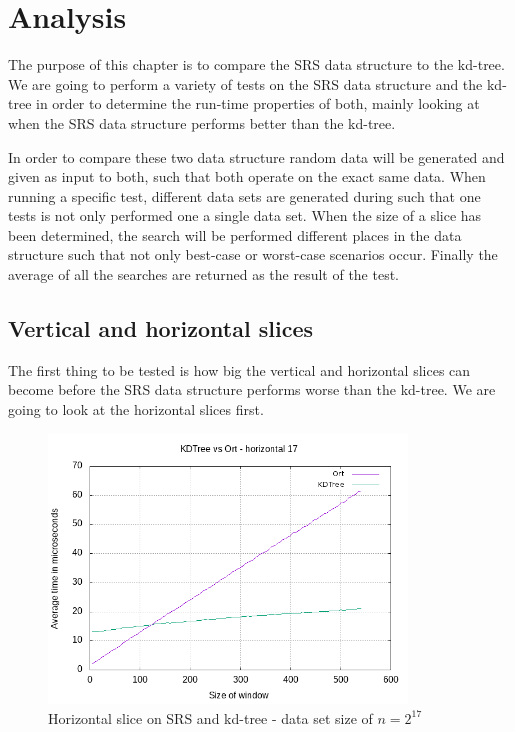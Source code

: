 \chapter{Analysis}
The purpose of this chapter is to compare the SRS data structure to the kd-tree. We are going to perform a variety of tests on the SRS data structure and the kd-tree in order to determine the run-time properties of both, mainly looking at when the SRS data structure performs better than the kd-tree.


In order to compare these two data structure random data will be generated and given as input to both, such that both operate on the exact same data. When running a specific test, different data sets are generated during such that one tests is not only performed one a single data set. When the size of a slice has been determined, the search will be performed different places in the data structure such that not only best-case or worst-case scenarios occur. Finally the average of all the searches are returned as the result of the test.


\section{Vertical and horizontal slices}
The first thing to be tested is how big the vertical and horizontal slices can become before the SRS data structure performs worse than the kd-tree. We are going to look at the horizontal slices first.


\begin{figure}[h]
    \centering
    \includegraphics[width = 0.85\textwidth]{pictures/analysis/hori_17.png}
    \caption{Horizontal slice on SRS and kd-tree - data set size of $n=2^{17}$}\label{fig:hori_17}
\end{figure}


